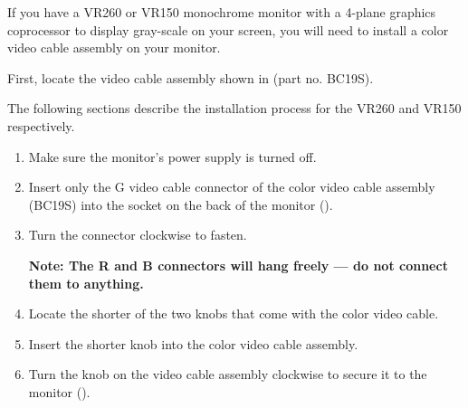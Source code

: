 \documentclass{dec}
\begin{document}
If you have a VR260 or VR150 monochrome monitor with a 4-plane graphics
coprocessor to display gray-scale on your screen, you will need to install a
color video cable assembly on your monitor.

First, locate the video cable assembly shown in  (part no. BC19S).

The following sections describe the installation process for the VR260 and
VR150 respectively.


\begin{enumerate}
\item Make sure the monitor's power supply is turned off.
\item Insert only the G video cable connector of the color video cable assembly
(BC19S) into the socket on the back of the monitor ().
\item Turn the connector clockwise to fasten.

\textbf{Note: The R and B connectors will hang freely — do not connect
them to anything.}


\item Locate the shorter of the two knobs that come with the color video cable.
\item Insert the shorter knob into the color video cable assembly.
\item Turn the knob on the video cable assembly clockwise to secure it to the
monitor ().


\end{enumerate}


\end{document}

